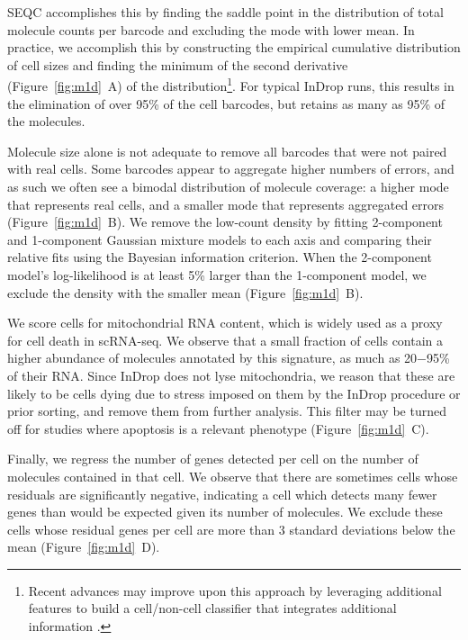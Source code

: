 SEQC accomplishes this by finding the saddle point in the distribution of total molecule counts per barcode and excluding the mode with lower mean. 
In practice, we accomplish this by constructing the empirical cumulative distribution of cell sizes and finding the minimum of the second derivative (Figure~\ref{fig:m1d}~A) of the distribution\footnote{Recent advances may improve upon this approach by leveraging additional features to build a cell/non-cell classifier that integrates additional information \citep{Petukhov2017}.}.
For typical InDrop runs, this results in the elimination of over 95\% of the cell barcodes, but retains as many as 95\% of the molecules.

Molecule size alone is not adequate to remove all barcodes that were not paired with real cells. 
Some barcodes appear to aggregate higher numbers of errors, and as such we often see a bimodal distribution of molecule coverage: a higher mode that represents real cells, and a smaller mode that represents aggregated errors (Figure~\ref{fig:m1d}~B). 
We remove the low-count density by fitting 2-component and 1-component Gaussian mixture models to each axis and comparing their relative fits using the Bayesian information criterion. 
When the 2-component model's log-likelihood is at least 5\% larger than the 1-component model, we exclude the density with the smaller mean (Figure~\ref{fig:m1d}~B).

We score cells for mitochondrial RNA content, which is widely used as a proxy for cell death in scRNA-seq. 
We observe that a small fraction of cells contain a higher abundance of molecules annotated by this signature, as much as 20−95\% of their RNA\@. 
Since InDrop does not lyse mitochondria, we reason that these are likely to be cells dying due to stress imposed on them by the InDrop procedure or prior sorting, and remove them from further analysis. %
This filter may be turned off for studies where apoptosis is a relevant phenotype (Figure~\ref{fig:m1d}~C).

Finally, we regress the number of genes detected per cell on the number of molecules contained in that cell. 
We observe that there are sometimes cells whose residuals are significantly negative, indicating a cell which detects many fewer genes than would be expected given its number of molecules. 
We exclude these cells whose residual genes per cell are more than 3 standard deviations
below the mean (Figure~\ref{fig:m1d}~D).

